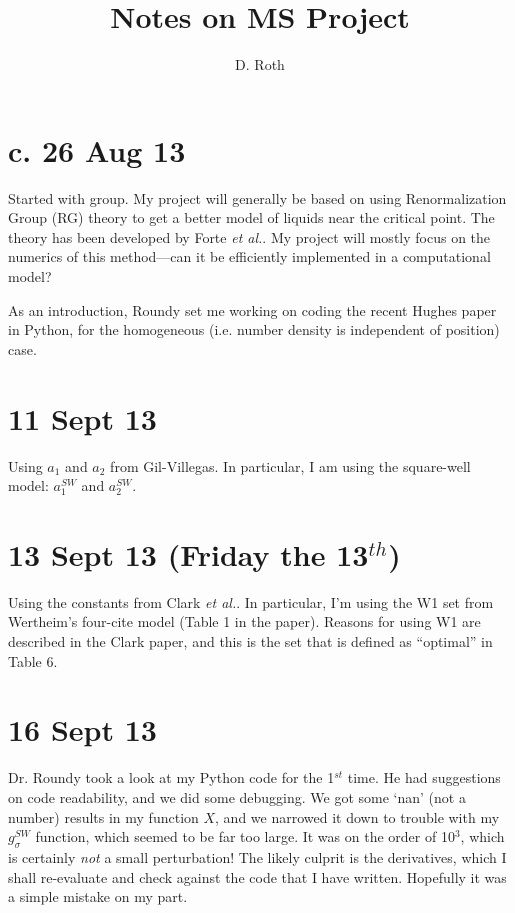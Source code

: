 \documentclass{article}
\begin{document}
\begin{sffamily}

\title{Notes on MS Project}
\author{D. Roth}
\date{}
\maketitle

\section{c. 26 Aug 13}
Started with group. My project will generally be based on using
Renormalization Group (RG) theory to get a better model of liquids
near the critical point. The theory has been developed by Forte
\textit{et al.}\cite{Forte11}. My project will mostly focus on the
numerics of this method---can it be efficiently implemented in a
computational model?

As an introduction, Roundy set me working on coding the recent Hughes
paper\cite{Hughes13} in Python, for the homogeneous (i.e. number
density is independent of position) case.

\section{11 Sept 13}
Using $a_1$ and $a_2$ from Gil-Villegas\cite{Gil-Villegas97}. In
particular, I am using the square-well model: $a_1^{SW}$ and
$a_2^{SW}$.

\section{13 Sept 13 (Friday the 13$^{th}$)}
Using the constants from Clark \textit{et al.}\cite{Clark06}. In
particular, I'm using the W1 set from Wertheim's four-cite model
(Table 1 in the paper). Reasons for using W1 are described in the
Clark paper, and this is the set that is defined as ``optimal'' in
Table 6.

\section{16 Sept 13}
Dr. Roundy took a look at my Python code for the 1$^{st}$ time. He had
suggestions on code readability, and we did some debugging. We got
some `nan' (not a number) results in my function $X$, and we narrowed
it down to trouble with my $g_\sigma^{SW}$ function, which seemed to
be far too large. It was on the order of 10$^3$, which is certainly
\textit{not} a small perturbation! The likely culprit is the
derivatives, which I shall re-evaluate and check against the code that
I have written. Hopefully it was a simple mistake on my part.


\end{sffamily}
\end{document}
